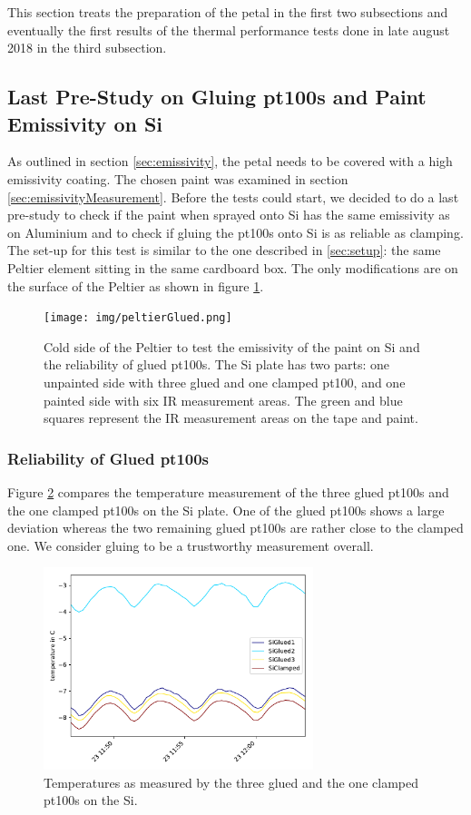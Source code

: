 This section treats the preparation of the petal in the first two subsections and eventually the first results of the thermal performance tests done in late august 2018 in the third subsection.
\subsection{Last Pre-Study on Gluing pt100s and Paint Emissivity on Si}
As outlined in section \ref{sec:emissivity}, the petal needs to be covered with a high emissivity coating. The chosen paint was examined in section \ref{sec:emissivityMeasurement}.
Before the tests could start, we decided to do a last pre-study to check if the paint when sprayed onto Si has the same emissivity as on Aluminium and to check if gluing the pt100s onto Si is as reliable as clamping. The set-up for this test is similar to the one described in \ref{sec:setup}: the same Peltier element sitting in the same cardboard box. The only modifications are on the surface of the Peltier as shown in figure \ref{fig:peltierGlue}.
\begin{figure}[h!]
	\centering
	\texttt{[image: img/peltierGlued.png]}
	\caption{Cold side of the Peltier to test the emissivity of the paint on Si and the reliability of glued pt100s. The Si plate has two parts: one unpainted side with three glued and one clamped pt100, and one painted side with six IR measurement areas. The green and blue squares represent the IR measurement areas on the tape and paint.}
	\label{fig:peltierGlue}
\end{figure}
\subsubsection{Reliability of Glued pt100s}
Figure \ref{fig:glueTemp} compares the temperature measurement of the three glued pt100s and the one clamped pt100s on the Si plate. One of the glued pt100s shows a large deviation whereas the two remaining glued pt100s are rather close to the clamped one. We consider gluing to be a trustworthy measurement overall.
\begin{figure}[h!]
	\centering
	\includegraphics[width=0.7\textwidth]{img/gluing.pdf}
	\caption{Temperatures as measured by the three glued and the one clamped pt100s on the Si.}
	\label{fig:glueTemp}
\end{figure}



